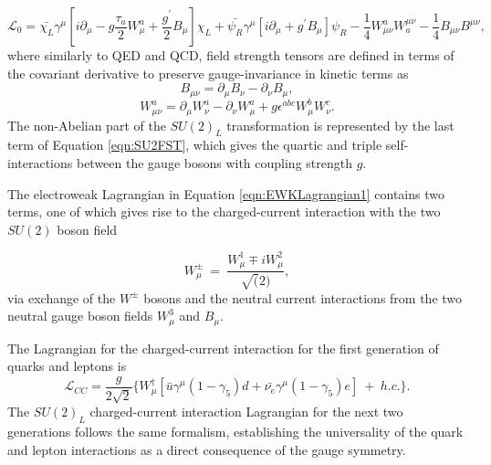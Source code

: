 \begin{equation}
\mathcal{L}_{0} = \bar{\chi_{L}}\gamma^{\mu} [i\partial_{\mu} - g \frac{\tau_{a}}{2} W^a_{\mu} + \frac{g^{'}}{2} B_{\mu} ] \chi_{L} + \bar{\psi_{R}} \gamma^{\mu} [ i \partial_{\mu} + g^{'} B_{\mu} ] \psi_{R} - \frac{1}{4} W_{\mu\nu}^{a} W^{\mu\nu}_{a} - \frac{1}{4} B_{\mu\nu} B^{\mu\nu},
\label{eqn:EWKLagrangian1}
\end{equation}
where similarly to QED and QCD, field strength tensors are defined in terms of the covariant derivative to preserve gauge-invariance in kinetic terms as
\begin{equation}
B_{\mu\nu} = \partial_{\mu}B_{\nu} - \partial_{\nu}B_{\mu},
\label{eqn:U1YFST}
\end{equation}
\begin{equation}
W_{\mu\nu}^{a} = \partial_{\mu}W_{\nu}^{a} - \partial_{\nu}W_{\mu}^{a} + g\epsilon^{abc}W_{\mu}^{b}W_{\nu}^{c}.
\label{eqn:SU2FST}
\end{equation}
The non-Abelian part of the $SU(2)_{L}$ transformation is represented by the last term of Equation \ref{eqn:SU2FST}, which gives the quartic and triple self-interactions between the gauge bosons with coupling strength $g$. 

The electroweak Lagrangian in Equation \ref{eqn:EWKLagrangian1} contains two terms, one of which gives rise to the charged-current interaction with the two $SU(2)$ boson field 

\begin{equation}
W^{\pm}_{\mu} ~=~ \frac{ W^{1}_{\mu} \mp iW^{2}_{\mu} } {\sqrt(2)},
\label{eqn:RealWBosons}
\end{equation}
via exchange of the $W^{\pm}$ bosons and the neutral current interactions from the two neutral gauge boson fields $W^{3}_{\mu}$ and $B_{\mu}$. 

The Lagrangian for the charged-current interaction for the first generation of quarks and leptons is 
\begin{equation}
\mathcal{L}_{CC} = \frac{g}{2\sqrt{2}} \{ W^{\dagger}_{\mu} [\bar{u}\gamma^{\mu}(1-\gamma_{5})d + \bar{\nu_{e}}\gamma^{\mu}(1-\gamma_{5})e ]~+~h.c. \}.
\label{eqn:SU2CCLag}
\end{equation}
The $SU(2)_{L}$ charged-current interaction Lagrangian for the next two generations follows the same formalism, establishing the universality of the quark and lepton interactions as a direct consequence of the gauge symmetry.

